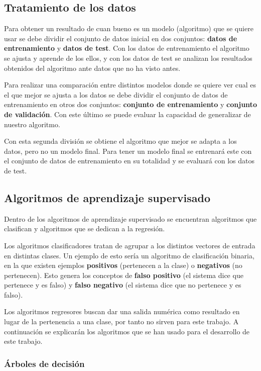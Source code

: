 \subsection{Tratamiento de los datos}

Para obtener un resultado de cuan bueno es un modelo (algoritmo) que se quiere usar se debe dividir el conjunto de datos inicial en dos conjuntos: \textbf{datos de entrenamiento} y \textbf{datos de test}. Con los datos de entrenamiento el algoritmo se ajusta y aprende de los ellos, y con los datos de test se analizan los resultados obtenidos del algoritmo ante datos que no ha visto antes.

Para realizar una comparación entre distintos modelos donde se quiere ver cual es el que mejor se ajusta a los datos se debe dividir el conjunto de datos de entrenamiento en otros dos conjuntos: \textbf{conjunto de entrenamiento} y \textbf{conjunto de validación}. Con este último se puede evaluar la capacidad de generalizar de nuestro algoritmo.

Con esta segunda división se obtiene el algoritmo que mejor se adapta a los datos, pero no un modelo final. Para tener un modelo final se entrenará este con el conjunto de datos de entrenamiento en su totalidad y se evaluará con los datos de test.

\subsection{Algoritmos de aprendizaje supervisado} \label{sec:algorithms}

Dentro de los algoritmos de aprendizaje supervisado se encuentran algoritmos que clasifican y algoritmos que se dedican a la regresión.

Los algoritmos clasificadores tratan de agrupar a los distintos vectores de entrada en distintas clases. Un ejemplo de esto sería un algoritmo de clasificación binaria, en la que existen ejemplos \textbf{positivos} (pertenecen a la clase) o \textbf{negativos} (no pertenecen). Esto genera los conceptos de \textbf{falso positivo} (el sistema dice que pertenece y es falso) y \textbf{falso negativo} (el sistema dice que no pertenece y es falso).

Los algoritmos regresores buscan dar una salida numérica como resultado en lugar de la pertenencia a una clase, por tanto no sirven para este trabajo. A continuación se explicarán los algoritmos que se han usado para el desarrollo de este trabajo.

\subsubsection{Árboles de decisión}


